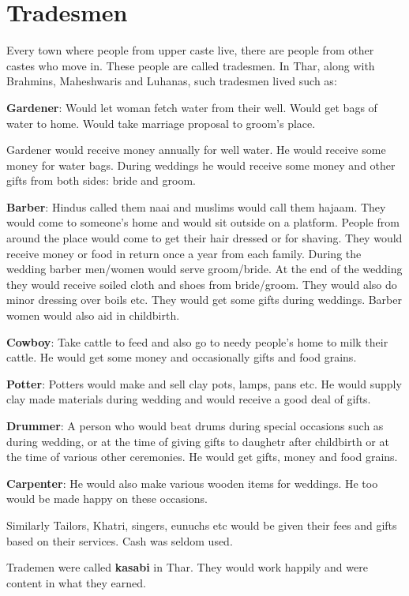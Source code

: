 \chapter{Tradesmen}
Every town where people from upper caste live, there are people from other
castes who move in. These people are called tradesmen. In Thar, along with
Brahmins, Maheshwaris and Luhanas, such tradesmen lived such as:

\textbf{Gardener}: Would let woman fetch water from their well. Would get bags
of water to home. Would take marriage proposal to groom's place.

Gardener would receive money annually for well water. He would receive some
money for water bags. During weddings he would receive some money and other
gifts from both sides: bride and groom.

\textbf{Barber}: Hindus called them naai and muslims would call them hajaam.
They would come to someone's home and would sit outside on a platform. People
from around the place would come to get their hair dressed or for shaving. They
would receive money or food in return once a year from each family. During the
wedding barber men/women would serve groom/bride. At the end of the wedding
they would receive soiled cloth and shoes from bride/groom. They would also do
minor dressing over boils etc. They would get some gifts during weddings.
Barber women would also aid in childbirth.

\textbf{Cowboy}: Take cattle to feed and also go to needy people's home to milk
their cattle. He would get some money and occasionally gifts and food grains.

\textbf{Potter}: Potters would make and sell clay pots, lamps, pans etc. He
would supply clay made materials during wedding and would receive a good deal
of gifts.

\textbf{Drummer}: A person who would beat drums during special occasions such
as during wedding, or at the time of giving gifts to daughetr after childbirth
or at the time of various other ceremonies. He would get gifts, money and food
grains.

\textbf{Carpenter}: He would also make various wooden items for weddings. He
too would be made happy on these occasions.

Similarly Tailors, Khatri, singers, eunuchs etc would be given their fees and
gifts based on their services. Cash was seldom used.

Trademen were called \textbf{kasabi} in Thar. They would work happily and were
content in what they earned.

